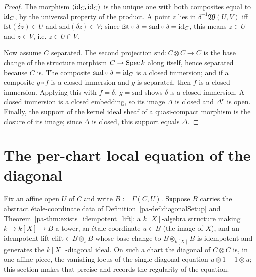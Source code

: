 \begin{proof}
  \leanok
  The morphism \(\langle \operatorname{id}_C, \operatorname{id}_C\rangle\) is the unique one with both composites equal to
  \(\operatorname{id}_C\), by the universal property of the product. A point \(z\) lies in
  \(\delta^{-1}\mathfrak W(U,V)\) iff \(\mathrm{fst}(\delta z) \in U\) and
  \(\mathrm{snd}(\delta z) \in V\); since \(\mathrm{fst} \circ \delta = \mathrm{snd} \circ \delta = \operatorname{id}_C\),
  this means \(z \in U\) and \(z \in V\), i.e. \(z \in U \cap V\).

  Now assume \(C\) separated. The second projection \(\mathrm{snd} \colon C \otimes C \to C\) is
  the base change of the structure morphism \(C \to \operatorname{Spec} k\) along itself, hence separated
  because \(C\) is. The composite \(\mathrm{snd} \circ \delta = \operatorname{id}_C\) is a closed immersion; and
  if a composite \(g \circ f\) is a closed immersion and \(g\) is separated, then \(f\) is a
  closed immersion. Applying this with \(f = \delta\), \(g = \mathrm{snd}\) shows \(\delta\) is a
  closed immersion. A closed immersion is a closed embedding, so its image \(\Delta\) is closed
  and \(\Delta^{\mathrm{c}}\) is open. Finally, the support of the kernel ideal sheaf of a
  quasi-compact morphism is the closure of its image; since \(\Delta\) is closed, this support
  equals \(\Delta\).
\end{proof}

\section{The per-chart local equation of the diagonal}

Fix an affine open \(U\) of \(C\) and write \(B := \Gamma(C, U)\). Suppose \(B\) carries the
abstract \'etale-coordinate data of Definition~\ref{pa-def:diagonalSetup} and
Theorem~\ref{pa-thm:exists_idempotent_lift}: a \(k[X]\)-algebra structure making \(k \to k[X] \to B\)
a tower, an \'etale coordinate \(u \in B\) (the image of \(X\)), and an idempotent lift
\(\mathrm{elift} \in B \otimes_k B\) whose base change to \(B \otimes_{k[X]} B\) is idempotent and
generates the \(k[X]\)-diagonal ideal. On such a chart the diagonal of \(C \otimes C\) is, in one
affine piece, the vanishing locus of the single diagonal equation \(u \otimes 1 - 1 \otimes u\);
this section makes that precise and records the regularity of the equation.

